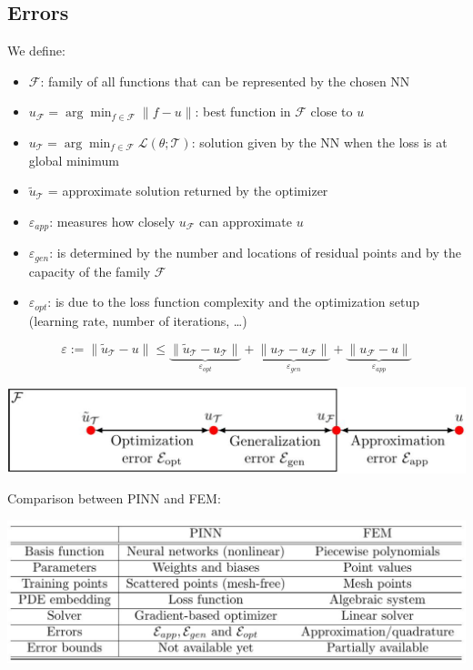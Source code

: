 \subsection{Errors}
We define:
\begin{itemize}
    \item $\mathcal{F}$: family of all functions that can be represented by the chosen NN
    \item $u_{\mathcal{F}} = \arg \min_{f \in \mathcal{F}} \|f-u\|$: best function in $\mathcal{F}$ close to $u$
    \item $u_{\mathcal{T}} = \arg \min_{f \in \mathcal{F}} \mathcal{L}(\theta; \mathcal{T})$: solution given by the NN when the loss is at global minimum
    \item $\tilde{u}_{\mathcal{T}}$ = approximate solution returned by the optimizer
    \item $\varepsilon_{app}$: measures how closely $u_{\mathcal{F}}$ can approximate $u$
    \item $\varepsilon_{gen}$: is determined by the number and locations of residual points and by the capacity of the family $\mathcal{F}$
    \item $\varepsilon_{opt}$: is due to the loss function complexity and the optimization setup (learning rate, number of iterations, \dots)
\end{itemize}

\[
    \varepsilon := \|\tilde{u}_{\mathcal{T}} - u\| \leq \underbrace{\|\tilde{u}_{\mathcal{T}} - u_{\mathcal{T}}\|}_{\varepsilon_{opt}} + \underbrace{\|u_{\mathcal{T}} - u_{\mathcal{F}}\|}_{\varepsilon_{gen}} + \underbrace{\|u_{\mathcal{F}} - u\|}_{\varepsilon_{app}}    
\]
\begin{center}
    \includegraphics[scale=0.3]{../images/PINN_Error.png}
\end{center}
Comparison between PINN and FEM:
\begin{center}
    \includegraphics[scale=0.3]{../images/PINN_FEM_Comparison.png}
\end{center}


